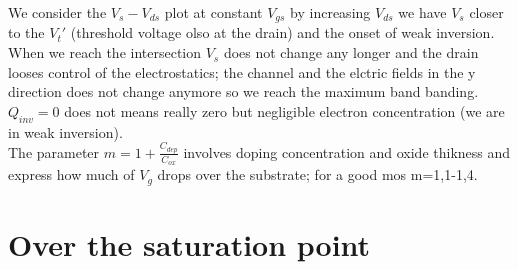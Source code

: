 We consider the $V_s-V_{ds}$ plot at constant $V_{gs}$ by increasing $V_{ds}$ we have $V_s$ closer to the $V_t'$ (threshold voltage olso at the drain) and the onset of weak inversion. When we reach the intersection $V_s$ does not change any longer and the drain looses control of the electrostatics; the channel and the elctric fields in the y direction does not change anymore so we reach the maximum band banding.\\ $Q_{inv}=0$ does not means really zero but negligible electron concentration (we are in weak inversion).\\
The parameter $m=1+\frac{C_{dep}}{C_{ox}}$ involves doping concentration and oxide thikness and express how much of $V_g$ drops over the substrate; for a good mos m=1,1-1,4.\\



\section{Over the saturation point}

